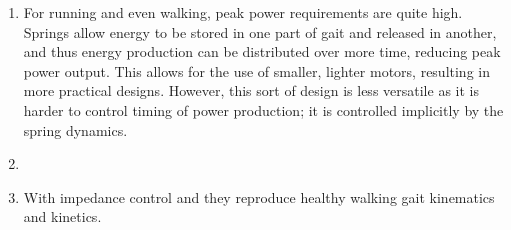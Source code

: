\begin{enumerate}
    \item {}


    For running and even walking, peak power requirements are quite high.
    Springs allow energy to be stored in one part of gait and released in
    another, and thus energy production can be distributed over more time,
    reducing peak power output. This allows for the use of smaller, lighter
    motors, resulting in more practical designs. However, this sort of design is
    less versatile as it is harder to control timing of power production; it is
    controlled implicitly by the spring dynamics.

    \item {}


    \item {}


    With impedance control and they reproduce healthy walking gait kinematics
    and kinetics.
\end{enumerate}

